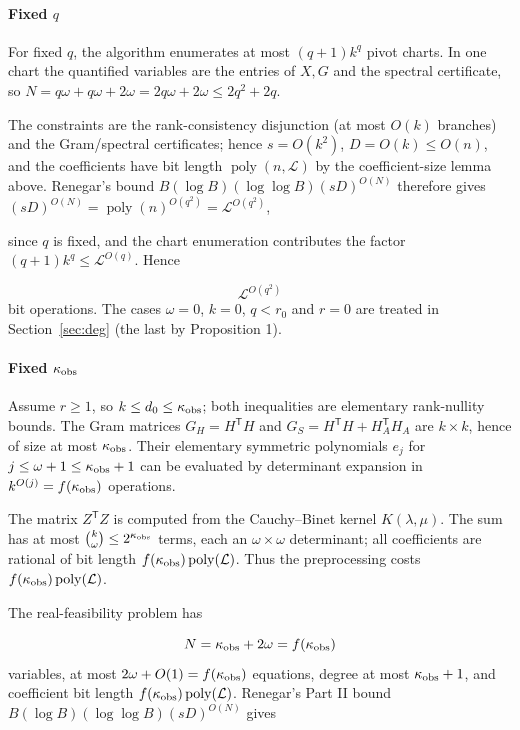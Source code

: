 \documentclass[journal]{IEEEtran}
\theoremstyle{plainn}
\begin{document}
\paragraph*{Fixed $q$}
For fixed $q$, the algorithm enumerates at most $(q+1)k^q$ pivot charts. In one chart the quantified variables are the entries of $X,G$ and the spectral certificate, so $N=q\omega+q\omega+2\omega=2q\omega+2\omega\le2q^2+2q$.

The constraints are the rank-consistency disjunction (at most $O(k)$ branches) and the Gram/spectral certificates; hence $s=O(k^2)$, $D=O(k)\le O(n)$, and the coefficients have bit length $\operatorname{poly}(n,\mathcal L)$ by the coefficient-size lemma above. Renegar's bound $B(\log B)(\log\log B)(sD)^{O(N)}$ therefore gives $(sD)^{O(N)}=\operatorname{poly}(n)^{O(q^2)}=\mathcal L^{O(q^2)}$,

since $q$ is fixed, and the chart enumeration contributes the factor $(q+1)k^q\le\mathcal L^{O(q)}$. Hence

\begin{equation}
\mathcal L^{O(q^2)}
\end{equation}
bit operations. The cases $\omega=0$, $k=0$, $q<r_0$ and $r=0$ are treated in Section~\ref{sec:deg} (the last by Proposition 1).

\paragraph*{Fixed $\kappa_{\rm obs}$}
Assume $r\ge1$, so $k\le d_0\le\kappa_{\rm obs}$; both inequalities are elementary rank-nullity bounds. The Gram matrices $G_H=H^{\mathsf T}H$ and $G_S=H^{\mathsf T}H+H_A^{\mathsf T}H_A$ are $k\times k$, hence of size at most $\kappa_{\rm obs}$. Their elementary symmetric polynomials $e_j$ for $j\le\omega+1\le\kappa_{\rm obs}+1$ can be evaluated by determinant expansion in $k^{O(j)}=f(\kappa_{\rm obs})$ operations.

The matrix $Z^{\mathsf T}Z$ is computed from the Cauchy--Binet kernel $K(\lambda,\mu)$. The sum has at most $\binom{k}{\omega}\le2^{\kappa_{\rm obs}}$ terms, each an $\omega\times \omega$ determinant; all coefficients are rational of bit length $f(\kappa_{\rm obs})\operatorname{poly}(\mathcal L)$. Thus the preprocessing costs $f(\kappa_{\rm obs})\operatorname{poly}(\mathcal L)$.

The real-feasibility problem has

\begin{equation}
N=\kappa_{\rm obs}+2\omega=f(\kappa_{\rm obs})
\end{equation}
variables, at most $2\omega+O(1)=f(\kappa_{\rm obs})$ equations, degree at most $\kappa_{\rm obs}+1$, and coefficient bit length $f(\kappa_{\rm obs})\operatorname{poly}(\mathcal L)$. Renegar's Part II bound $B(\log B)(\log\log B)(sD)^{O(N)}$ gives
\end{document}
